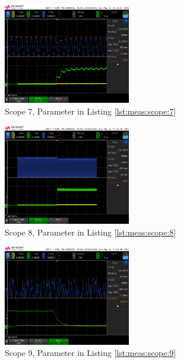 \begin{figure}[h!tb]
    \centering
    \includegraphics[width=0.5\textwidth]{images/scopeShots/scope_7.png}
    \caption{Scope 7, Parameter in Listing \ref{lst:meas:scope:7}}
    \label{fig:meas:scope:7}
\end{figure}

\begin{figure}[h!tb]
    \centering
    \includegraphics[width=0.5\textwidth]{images/scopeShots/scope_8.png}
    \caption{Scope 8, Parameter in Listing \ref{lst:meas:scope:8}}
    \label{fig:meas:scope:8}
\end{figure}

\begin{figure}[h!tb]
    \centering
    \includegraphics[width=0.5\textwidth]{images/scopeShots/scope_9.png}
    \caption{Scope 9, Parameter in Listing \ref{lst:meas:scope:9}}
    \label{fig:meas:scope:9}
\end{figure}

